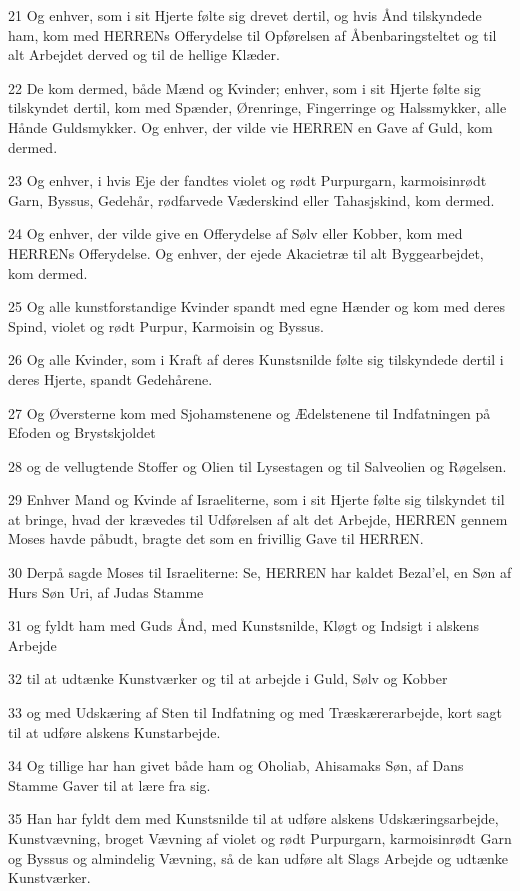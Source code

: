 \par 21 Og enhver, som i sit Hjerte følte sig drevet dertil, og hvis Ånd tilskyndede ham, kom med HERRENs Offerydelse til Opførelsen af Åbenbaringsteltet og til alt Arbejdet derved og til de hellige Klæder.
\par 22 De kom dermed, både Mænd og Kvinder; enhver, som i sit Hjerte følte sig tilskyndet dertil, kom med Spænder, Ørenringe, Fingerringe og Halssmykker, alle Hånde Guldsmykker. Og enhver, der vilde vie HERREN en Gave af Guld, kom dermed.
\par 23 Og enhver, i hvis Eje der fandtes violet og rødt Purpurgarn, karmoisinrødt Garn, Byssus, Gedehår, rødfarvede Væderskind eller Tahasjskind, kom dermed.
\par 24 Og enhver, der vilde give en Offerydelse af Sølv eller Kobber, kom med HERRENs Offerydelse. Og enhver, der ejede Akacietræ til alt Byggearbejdet, kom dermed.
\par 25 Og alle kunstforstandige Kvinder spandt med egne Hænder og kom med deres Spind, violet og rødt Purpur, Karmoisin og Byssus.
\par 26 Og alle Kvinder, som i Kraft af deres Kunstsnilde følte sig tilskyndede dertil i deres Hjerte, spandt Gedehårene.
\par 27 Og Øversterne kom med Sjohamstenene og Ædelstenene til Indfatningen på Efoden og Brystskjoldet
\par 28 og de vellugtende Stoffer og Olien til Lysestagen og til Salveolien og Røgelsen.
\par 29 Enhver Mand og Kvinde af Israeliterne, som i sit Hjerte følte sig tilskyndet til at bringe, hvad der krævedes til Udførelsen af alt det Arbejde, HERREN gennem Moses havde påbudt, bragte det som en frivillig Gave til HERREN.
\par 30 Derpå sagde Moses til Israeliterne: Se, HERREN har kaldet Bezal'el, en Søn af Hurs Søn Uri, af Judas Stamme
\par 31 og fyldt ham med Guds Ånd, med Kunstsnilde, Kløgt og Indsigt i alskens Arbejde
\par 32 til at udtænke Kunstværker og til at arbejde i Guld, Sølv og Kobber
\par 33 og med Udskæring af Sten til Indfatning og med Træskærerarbejde, kort sagt til at udføre alskens Kunstarbejde.
\par 34 Og tillige har han givet både ham og Oholiab, Ahisamaks Søn, af Dans Stamme Gaver til at lære fra sig.
\par 35 Han har fyldt dem med Kunstsnilde til at udføre alskens Udskæringsarbejde, Kunstvævning, broget Vævning af violet og rødt Purpurgarn, karmoisinrødt Garn og Byssus og almindelig Vævning, så de kan udføre alt Slags Arbejde og udtænke Kunstværker.

